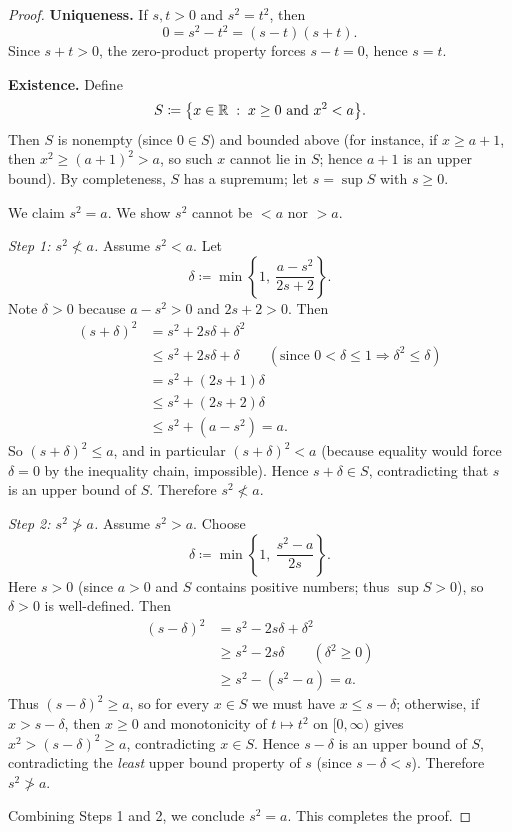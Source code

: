 \documentclass[12pt]{article}
\numberwithin{equation}{section}
\newcommand{\RR}{\mathbb{R}}
\DeclarePairedDelimiter{\set}{\{}{\}}
\newcommand{\st}{\;:\;}                      %
\theoremstyle{plain}
\theoremstyle{definition}
\theoremstyle{remark}
\begin{document}
\begin{proof}
\textbf{Uniqueness.} If $s,t>0$ and $s^2=t^2$, then
\[
0 = s^2-t^2 = (s-t)(s+t).
\]
Since $s+t>0$, the zero-product property forces $s-t=0$, hence $s=t$.

\textbf{Existence.} Define
\[
S \coloneqq \set*{x\in\RR \st x\ge 0 \text{ and } x^2 < a}.
\]
Then $S$ is nonempty (since $0\in S$) and bounded above (for instance, if $x\ge a+1$, then $x^2\ge (a+1)^2>a$, so such $x$ cannot lie in $S$; hence $a+1$ is an upper bound).
By completeness, $S$ has a supremum; let $s=\sup S$ with $s\ge 0$.

We claim $s^2=a$. We show $s^2$ cannot be $<a$ nor $>a$.

\medskip
\noindent\emph{Step 1: $s^2\not<a$.}
Assume $s^2<a$. Let
\[
\delta \coloneqq \min\!\left\{1,\ \frac{a-s^2}{2s+2}\right\}.
\]
Note $\delta>0$ because $a-s^2>0$ and $2s+2>0$. Then
\begin{align*}
(s+\delta)^2
&= s^2 + 2s\delta + \delta^2\\
&\le s^2 + 2s\delta + \delta \qquad (\text{since } 0<\delta\le 1 \Rightarrow \delta^2\le \delta)\\
&= s^2 + (2s+1)\delta\\
&\le s^2 + (2s+2)\delta\\
&\le s^2 + (a-s^2) = a.
\end{align*}
So $(s+\delta)^2\le a$, and in particular $(s+\delta)^2<a$ (because equality would force $\delta=0$ by the inequality chain, impossible).
Hence $s+\delta\in S$, contradicting that $s$ is an upper bound of $S$.
Therefore $s^2\not<a$.

\medskip
\noindent\emph{Step 2: $s^2\not>a$.}
Assume $s^2>a$. Choose
\[
\delta \coloneqq \min\!\left\{1,\ \frac{s^2-a}{2s}\right\}.
\]
Here $s>0$ (since $a>0$ and $S$ contains positive numbers; thus $\sup S>0$), so $\delta>0$ is well-defined.
Then
\begin{align*}
(s-\delta)^2
&= s^2 - 2s\delta + \delta^2\\
&\ge s^2 - 2s\delta \qquad (\delta^2\ge 0)\\
&\ge s^2 - (s^2-a)=a.
\end{align*}
Thus $(s-\delta)^2\ge a$, so for every $x\in S$ we must have $x\le s-\delta$; otherwise, if $x> s-\delta$, then $x\ge 0$ and monotonicity of $t\mapsto t^2$ on $[0,\infty)$ gives $x^2>(s-\delta)^2\ge a$, contradicting $x\in S$.
Hence $s-\delta$ is an upper bound of $S$, contradicting the \emph{least} upper bound property of $s$ (since $s-\delta<s$).
Therefore $s^2\not>a$.

Combining Steps 1 and 2, we conclude $s^2=a$. This completes the proof.
\end{proof}
\end{document}
